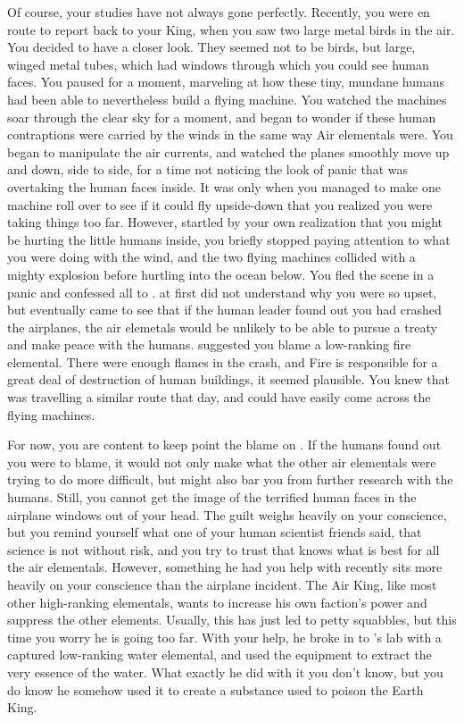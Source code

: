 \documentclass[char]{elementals}
\begin{document}
Of course, your studies have not always gone perfectly.  Recently, you were en route to report back to your King, when you saw two large metal birds in the air.  You decided to have a closer look.  They seemed not to be birds, but large, winged metal tubes, which had windows through which you could see human faces.  You paused for a moment, marveling at how these tiny, mundane humans had been able to nevertheless build a flying machine.  You watched the machines soar through the clear sky for a moment, and began to wonder if these human contraptions were carried by the winds in the same way Air elementals were.  You began to manipulate the air currents, and watched the planes smoothly move up and down, side to side, for a time not noticing the look of panic that was overtaking the human faces inside.  It was only when you managed to make one machine roll over to see if it could fly upside-down that you realized you were taking things too far.  However, startled by your own realization that you might be hurting the little humans inside, you briefly stopped paying attention to what you were doing with the wind, and the two flying machines collided with a mighty explosion before hurtling into the ocean below.  You fled the scene in a panic and confessed all to \cKing{}.  \cKing{\They} at first did not understand why you were so upset, but eventually \cKing{\they} came to see that if the human leader found out you had crashed the airplanes, the air elemetals would be unlikely to be able to pursue a treaty and make peace with the humans.  \cKing{} suggested you blame a low-ranking fire elemental.  There were enough flames in the crash, and Fire is responsible for a great deal of destruction of human buildings, it seemed plausible.  You knew that \cJuliet{\intro} was travelling a similar route that day, and could have easily come across the flying machines.

For now, you are content to keep point the blame on \cJuliet{\them}.  If the humans found out you were to blame, it would not only make what the other air elementals were trying to do more difficult, but might also bar you from further research with the humans.  Still, you cannot get the image of the terrified human faces in the airplane windows out of your head.  The guilt weighs heavily on your conscience, but you remind yourself what one of your human scientist friends said, that science is not without risk, and you try to trust that \cKing{} knows what is best for all the air elementals.  However, something he had you help with recently sits more heavily on your conscience than the airplane incident.  The Air King, like most other high-ranking elementals, wants to increase his own faction's power and suppress the other elements.  Usually, this has just led to petty squabbles, but this time you worry he is going too far.  With your help, he broke in to \cGD{}'s lab with a captured low-ranking water elemental, and used the equipment to extract the very essence of the water.  What exactly he did with it you don't know, but you do know he somehow used it to create a substance used to poison the Earth King.  
\end{document}
